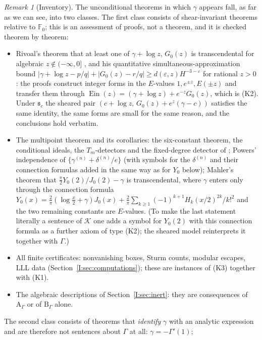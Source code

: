 \documentclass[11pt,a4paper]{article}
\newcommand{\Ein}{\operatorname{Ein}}
\newcommand{\Fld}{\mathbb F}
\newcommand{\Th}{\mathcal K}
\newcommand{\shear}{\mathfrak s}
\theoremstyle{definition}
\theoremstyle{remark}
\newtheorem{remark}[theorem]{Remark}
\numberwithin{equation}{section}
\begin{document}
\begin{remark}[Inventory]\label{I:rem:inventory}
The unconditional theorems in which $\gamma$ appears fall, as far as we can see, into
two classes. The first class consists of shear-invariant theorems relative to
$\Fld_0$; this is an assessment of proofs, not a theorem, and it is checked theorem by
theorem:
\begin{itemize}[leftmargin=*]
\item Rivoal's theorem that at least one of $\gamma+\log z$, $G_0(z)$ is transcendental
for algebraic $z\notin(-\infty,0]$ \cite[Thm.~2]{Rivoal2012}, and his quantitative
simultaneous-approximation bound
$|\gamma+\log z-p/q|+|G_0(z)-r/q|\ge d(\varepsilon,z)H^{-3-\varepsilon}$ for rational
$z>0$ \cite[Thm.~1]{Rivoal2012}: the proofs construct integer forms in the $E$-values
$1,e^{\pm z},E(\pm z)$ and transfer them through
$\Ein(z)=(\gamma+\log z)+e^{-z}G_0(z)$, which is (K2). Under $\shear_c$ the sheared pair
$(c+\log z,\,G_0(z)+e^z(\gamma-c))$ satisfies the same identity, the same forms are small
for the same reason, and the conclusions hold verbatim.
\item The multipoint theorem and its corollaries: the six-constant theorem, the
conditional ideals, the $T_m$-detectors and the fixed-degree detector of \cite{K001};
Powers' independence of $\{\gamma^{(n)}+\delta^{(n)}/e\}$ \cite{Powers2025} (with
symbols for the $\delta^{(n)}$ and their connection formulas added in the same way as
for $Y_0$ below); Mahler's
theorem that $\tfrac{\pi}{2}Y_0(2)/J_0(2)-\gamma$ is transcendental, where $\gamma$ enters
only through the connection formula
$Y_0(x)=\tfrac2\pi(\log\tfrac x2+\gamma)J_0(x)+\tfrac2\pi\sum_{k\ge1}(-1)^{k+1}H_k(x/2)^{2k}/k!^2$
and the two remaining constants are $E$-values. (To make the last statement literally a
sentence of $\Th$ one adds a symbol for $Y_0(2)$ with this connection formula as a
further axiom of type (K2); the sheared model reinterprets it together with $\Gamma$.)
\item All finite certificates: nonvanishing boxes, Sturm counts, modular escapes, LLL
data (Section~\ref{I:sec:computations}); these are instances of (K3) together with (K1).
\item The algebraic descriptions of Section~\ref{I:sec:inert}: they are consequences of
$\mathrm A_\Gamma$ or of $\mathrm B_\Gamma$ alone.
\end{itemize}
The second class consists of theorems that \emph{identify} $\gamma$ with an analytic
expression and are therefore not sentences about $\Gamma$ at all: $\gamma=-\Gamma'(1)$;

\end{remark}
\end{document}
